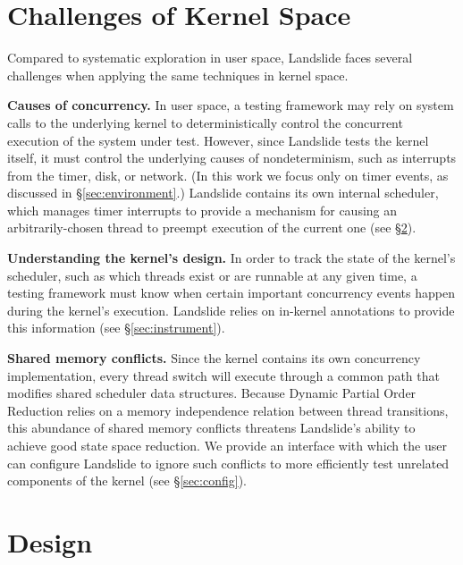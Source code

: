 \documentclass{llncs}
\begin{document}
\section{Challenges of Kernel Space}

Compared to systematic exploration in user space, Landslide faces several challenges when applying the same techniques in kernel space.

{\bf Causes of concurrency.} In user space, a testing framework may rely on system calls to the underlying kernel to deterministically control the concurrent execution of the system under test.
However, since Landslide tests the kernel itself, it must control the underlying causes of nondeterminism, such as interrupts from the timer, disk, or network. (In this work we focus only on timer events, as discussed in \S\ref{sec:environment}.)
Landslide contains its own internal scheduler, which manages timer interrupts to provide a mechanism for causing an arbitrarily-chosen thread to preempt execution of the current one (see \S\ref{sec:design}).

{\bf Understanding the kernel's design.} In order to track the state of the kernel's scheduler, such as which threads exist or are runnable at any given time, a testing framework must know when certain important concurrency events happen during the kernel's execution.
Landslide relies on in-kernel annotations to provide this information (see \S\ref{sec:instrument}).

{\bf Shared memory conflicts.} Since the kernel contains its own concurrency implementation, every thread switch will execute through a common path that modifies shared scheduler data structures.
Because Dynamic Partial Order Reduction relies on a memory independence relation between thread transitions, this abundance of shared memory conflicts threatens Landslide's ability to achieve good state space reduction.
We provide an interface with which the user can configure Landslide to ignore such conflicts to more efficiently test unrelated components of the kernel (see \S\ref{sec:config}).


\section{Design}
\label{sec:design}
\end{document}
